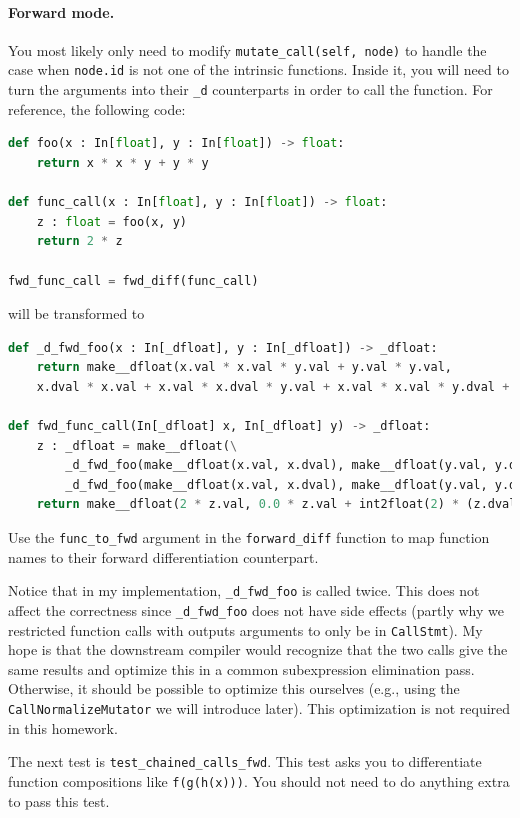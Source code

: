 \paragraph{Forward mode.} You most likely only need to modify \lstinline{mutate_call(self, node)} to handle the case when \lstinline{node.id} is not one of the intrinsic functions. Inside it, you will need to turn the arguments into their \lstinline{_d} counterparts in order to call the function. For reference, the following code:
\begin{lstlisting}[language=Python]
def foo(x : In[float], y : In[float]) -> float:
    return x * x * y + y * y

def func_call(x : In[float], y : In[float]) -> float:
    z : float = foo(x, y)
    return 2 * z

fwd_func_call = fwd_diff(func_call)
\end{lstlisting}
will be transformed to
\begin{lstlisting}[language=Python]
def _d_fwd_foo(x : In[_dfloat], y : In[_dfloat]) -> _dfloat:
    return make__dfloat(x.val * x.val * y.val + y.val * y.val,
    x.dval * x.val + x.val * x.dval * y.val + x.val * x.val * y.dval + y.dval * y.val + y.val * y.dval)

def fwd_func_call(In[_dfloat] x, In[_dfloat] y) -> _dfloat:
    z : _dfloat = make__dfloat(\
        _d_fwd_foo(make__dfloat(x.val, x.dval), make__dfloat(y.val, y.dval)).val,
        _d_fwd_foo(make__dfloat(x.val, x.dval), make__dfloat(y.val, y.dval)).dval)
    return make__dfloat(2 * z.val, 0.0 * z.val + int2float(2) * (z.dval))
\end{lstlisting}
Use the \lstinline{func_to_fwd} argument in the \lstinline{forward_diff} function to map function names to their forward differentiation counterpart.

Notice that in my implementation, \lstinline{_d_fwd_foo} is called twice. This does not affect the correctness since \lstinline{_d_fwd_foo} does not have side effects (partly why we restricted function calls with outputs arguments to only be in \lstinline{CallStmt}). My hope is that the downstream compiler would recognize that the two calls give the same results and optimize this in a common subexpression elimination pass. Otherwise, it should be possible to optimize this ourselves (e.g., using the \lstinline{CallNormalizeMutator} we will introduce later). This optimization is not required in this homework.

The next test is \lstinline{test_chained_calls_fwd}. This test asks you to differentiate function compositions like \lstinline{f(g(h(x)))}. You should not need to do anything extra to pass this test.

